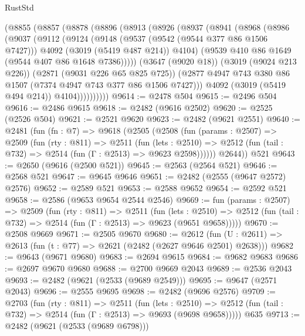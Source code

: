 \begin{lexlean}{RustStd}
\begin{coremodule}
      (@8855
        (@8857
          (@8878
            (@8896
              (@8913
                (@8926
                  (@8937
                    (@8941
                      (@8968
                        (@8986
                          (@9037
                            (@9112
                              (@9124
                                (@9148
                                  (@9537 (@9542 (@9544 @377 @86 @1506 @7427)))
                                  @4092
                                  (@3019 (@5419 @487 @214))
                                  @4104)
                                (@9539 @410 @86 @1649 (@9544 @407 @86 @1648 @7386)))))
                          (@3647 (@9020 @18))
                          (@3019 (@9024 @213 @226))
                          (@2871 (@9031 @226 @65 @825 @725))
                          (@2877 @4947 @743 @380 @86 @1507 (@7374 @4947 @743 @377 @86 @1506 @7427)))
                        @4092
                        (@3019 (@5419 @494 @214))
                        @4104))))))))))
@9614 := @2478 @504
@9615 := @2496 @504
@9616 := @2486 @9615
@9618 := @2482 (@9616 @2502)
@9620 := @2525 (@2526 @504)
@9621 := @2521 @9620
@9623 := @2482 (@9621 @2551)
@9640 := @2481
    (fun (fn : @7) =>
    @9618
      (@2505
        (@2508
          (fun (params : @2507) =>
          @2509
            (fun (rty : @811) =>
            @2511
              (fun (lets : @2510) =>
              @2512 (fun (tail : @732) => @2514 (fun (Γ : @2513) => @9623 @2598))))))
        @2644))
    @521
@9643 := @2650 (@9616 (@2500 @521))
@9645 := @2563 (@2564 @521)
@9646 := @2568 @521
@9647 := @9645 @9646
@9651 := @2482 (@2555 (@9647 @2572) @2576)
@9652 := @2589 @521
@9653 := @2588 @9652
@9654 := @2592 @521
@9658 := @2586 (@9653 @9654 @2544 @2546)
@9669 := fun (params : @2507) =>
  @2509
    (fun (rty : @811) =>
    @2511
      (fun (lets : @2510) =>
      @2512 (fun (tail : @732) => @2514 (fun (Γ : @2513) => @9623 (@9651 @9658)))))
@9670 := @2508 @9669
@9671 := @2505 @9670
@9680 := @2612 (fun (U : @2611) => @2613 (fun (t : @77) => @2621 (@2482 (@2627 @9646 @2501) @2638)))
@9682 := @9643 (@9671 @9680)
@9683 := @2694 @9615
@9684 := @9682 @9683
@9686 := @2697 @9670 @9680
@9688 := @2700 @9669 @2043
@9689 := @2536 @2043
@9693 := @2482 (@9621 (@2533 (@9689 @2549)))
@9695 := @9647 (@2571 @2043)
@9696 := @2555 @9695
@9698 := @2482 (@9696 @2576)
@9709 := @2703
    (fun (rty : @811) =>
    @2511
      (fun (lets : @2510) =>
      @2512 (fun (tail : @732) => @2514 (fun (Γ : @2513) => @9693 (@9698 @9658)))))
    @635
@9713 := @2482 (@9621 (@2533 (@9689 @6798)))

\end{coremodule}
\end{lexlean}
